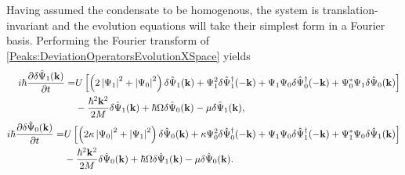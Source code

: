 Having assumed the condensate to be homogenous, the system is translation-invariant and the evolution equations will take their simplest form in a Fourier basis. Performing the Fourier transform of \eqref{Peaks:DeviationOperatorsEvolutionXSpace} yields
\begin{subequations}
    \label{Peaks:DeviationOperatorsEvolutionKSpace}
    \begin{align}
        \begin{split}
            i \hbar \frac{\partial \delta \hat{\Psi}_1(\mathbf{k})}{\partial t} =& U\left[ \left(2\abs{\Psi_1}^2+\abs{\Psi_0}^2 \right)\delta \hat{\Psi}_1(\mathbf{k}) + \Psi_1^2\delta\hat{\Psi}_1^\dagger(-\mathbf{k}) + \Psi_1\Psi_0\delta\hat{\Psi}_0^\dagger(-\mathbf{k}) + \Psi_0^*\Psi_1\delta\hat{\Psi}_0(\mathbf{k})\right]\\
                    & - \frac{\hbar^2 \mathbf{k}^2}{2M} \delta \hat{\Psi}_1(\mathbf{k}) +\hbar \Omega\delta\hat{\Psi}_0(\mathbf{k})- \mu \delta \hat{\Psi}_1(\mathbf{k}),
        \end{split}\\
        \begin{split}
        i \hbar \frac{\partial \delta \hat{\Psi}_0(\mathbf{k})}{\partial t} =& U\left[\left(2\kappa \abs{\Psi_0}^2 +\abs{\Psi_1}^2\right)\delta\hat{\Psi}_0(\mathbf{k}) + \kappa \Psi_0^2 \delta\hat{\Psi}_0^\dagger(-\mathbf{k}) + \Psi_1\Psi_0\delta\hat{\Psi}_1^\dagger(-\mathbf{k}) + \Psi_1^*\Psi_0\delta\hat{\Psi}_1(\mathbf{k})\right]\\
                    & -\frac{\hbar^2 \mathbf{k}^2}{2M} \delta \hat{\Psi}_0(\mathbf{k}) +\hbar \Omega\delta\hat{\Psi}_1(\mathbf{k}) - \mu \delta\hat{\Psi}_0(\mathbf{k}).
        \end{split}
    \end{align}
\end{subequations}

